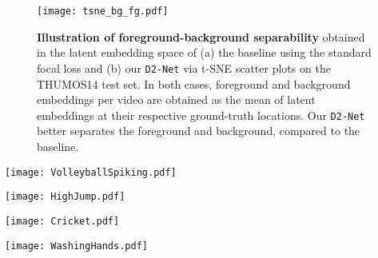 \documentclass[10pt,twocolumn,letterpaper]{article}
\def\proposed{\texttt{D2-Net}{}}
\begin{document}
\begin{figure}[h!]
    \centering
    \texttt{[image: tsne\_bg\_fg.pdf]}
    \caption{\textbf{Illustration of foreground-background separability} obtained in the latent embedding space of (a) the baseline using the standard focal loss and (b) our \proposed{} via t-SNE scatter plots on the THUMOS14 test set. In both cases, foreground and background embeddings per video are obtained as the mean of latent embeddings at their respective ground-truth locations. Our \proposed{} better separates the foreground and background, compared to the baseline.\vspace{-0.2cm}}
    \label{fig:tsne}
\end{figure}



\begin{figure*}[t]
    \centering
    \texttt{[image: VolleyballSpiking.pdf]}
    \caption{\label{fig:qual_res_thumos4}The first two instances of \textit{Volleyball Spiking} have a considerable pause in the video, resulting in the absence of motion for the corresponding frames. \Eg, an inset of sample frames in the second instance shows the pause in the video containing zero motion. This absence of discriminative motion information leads to four incorrect detections for these two GT instances. 
    }
\end{figure*}




\begin{figure*}[t]
    \centering
    \texttt{[image: HighJump.pdf]}
    \caption{ \label{fig:qual_res_thumos5}Temporally adjacent action instances of \textit{High Jump} (sixth and seventh instances) are correctly detected as distinct instances by our \proposed{}. 
}
\end{figure*}



\begin{figure*}[t]
    \centering
    \texttt{[image: Cricket.pdf]}
    \caption{\label{fig:qual_res_acn1}Well separated instances of \textit{Cricket} activity are detected accurately by our \proposed{}.
}
\end{figure*}



\begin{figure*}[t]
    \centering
    \texttt{[image: WashingHands.pdf]}
    \caption{\label{fig:qual_res_acn2}The two adjacent ground-truth \textit{Washing Hands} instances are jointly detected as a single instance by our \proposed{}, since the separating background is indiscriminable from the foreground activity. Sample background frames, shown inset, contain hands along with soap lather and flowing water and are visually similar to the foreground activity.
}
\end{figure*}
\end{document}
